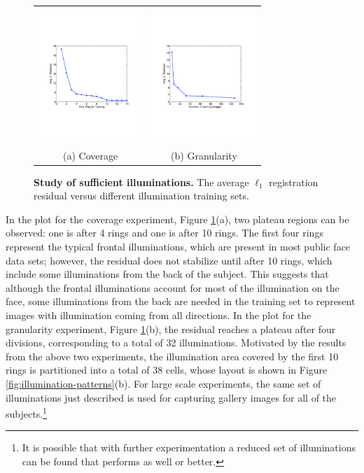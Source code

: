 \begin{figure}
\centering
\begin{tabular}{@{}c@{}c@{}}
\includegraphics[height=2in]{figures_pami/illum_results/coverage_sunset.pdf} &
\includegraphics[height=2in]{figures_pami/illum_results/granularity_sunset.pdf} \\
(a) Coverage & (b) Granularity
\end{tabular}
\caption{\small{\bf Study of sufficient illuminations.} The average $\ell_1$
registration residual versus different illumination training sets. }
\label{fig:illumination-sufficiency}
\end{figure}

In the plot for the coverage experiment, Figure
\ref{fig:illumination-sufficiency}(a), two plateau regions can be observed: one
is after 4 rings and one is after 10 rings. The first four rings represent the
typical frontal illuminations, which are present in most public face data sets;
however, the residual does not stabilize until after 10 rings, which include
some illuminations from the back of the subject. This suggests that although
the frontal illuminations account for most of the illumination on the face,
some illuminations from the back are needed in the training set to represent
images with illumination coming from all directions.  In the plot for the
granularity experiment, Figure \ref{fig:illumination-sufficiency}(b), the
residual reaches a plateau after four divisions, corresponding to a total of 32
illuminations. Motivated by the results from the above two experiments, the
illumination area covered by the first 10 rings is partitioned into a total of
38 cells, whose layout is shown in Figure \ref{fig:illumination-patterns}(b).
For large scale experiments, the same set of illuminations just described is
used for capturing gallery images for all of the subjects.\footnote{It is
possible that with further experimentation a reduced set of illuminations can
be found that performs as well or better.}

